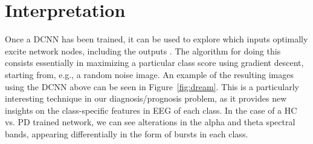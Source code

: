\documentclass[review]{elsarticle}
\begin{document}
\section{Interpretation }
Once a DCNN has been trained, it can be used to explore which inputs optimally excite network nodes, including the outputs \cite{Simonayan:2014aa}. The algorithm for doing this consists essentially in maximizing a particular class score using gradient descent, starting from, e.g., a random noise image. An example of the resulting images using the DCNN above can be seen in Figure~\ref{fig:dream}. This is a particularly interesting technique in our diagnosis/prognosis problem, as it provides new insights on the class-specific features in EEG of each class. %
In the case of a HC vs. PD trained network, we can see alterations in the alpha and theta spectral bands, appearing differentially in the form of bursts in each class.

%		
%
\end{document}
